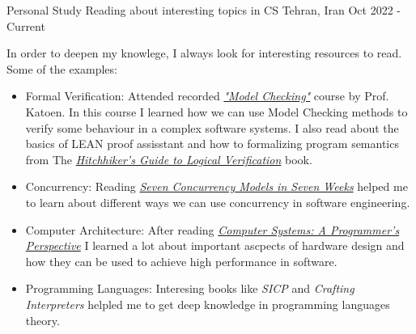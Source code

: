 \begin{cventries}
\cventry
{Personal Study} %
{Reading about interesting topics in CS} %
{Tehran, Iran} %
{Oct 2022 - Current} %
{
  \begin{cvitems} %
    \item {In order to deepen my knowlege, I always look for interesting resources to read.
      Some of the examples:
      \begin{itemize}
        \item  Formal Verification: \newline
                Attended recorded \href{https://www.youtube.com/playlist?list=PLwabKnOFhE38C0o6z_bhlF_uOUlblDTjh}{\textit{"Model Checking"}} course by Prof. Katoen. In this course I learned how we can use Model Checking methods to verify some behaviour in a complex software systems.
                \newline
                I also read about the basics of LEAN proof assisstant and how to formalizing program semantics from The \href{https://github.com/blanchette/logical_verification_2023}{\textit{Hitchhiker’s Guide to Logical Verification}} book.
        \item  Concurrency: \newline
                Reading \href{https://pragprog.com/titles/pb7con/seven-concurrency-models-in-seven-weeks/}{\textit{Seven Concurrency Models in Seven Weeks}} helped me to learn about different ways we can use concurrency in software engineering.
        \item Computer Architecture:
                \newline
                After reading
        \href{http://csapp.cs.cmu.edu/2e/samples.html}{\textit{
            Computer Systems: A Programmer's Perspective}} I learned a lot about important ascpects of hardware design and how they can be used to achieve high performance in software.
        \item Programming Languages:
                \newline
                Interesing books like \textit{SICP} and \textit{Crafting Interpreters} helpled me to get deep knowledge in programming languages theory.
      \end{itemize}
    }
  \end{cvitems}
}


\end{cventries}
